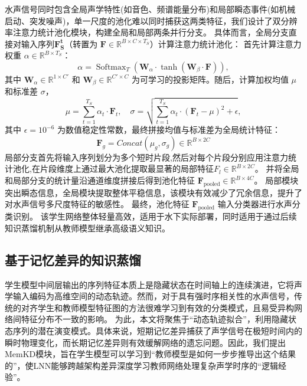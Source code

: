 \documentclass[a4paper, 12pt]{article}
\begin{document}
水声信号同时包含全局声学特性(如音色、频谱能量分布)和局部瞬态事件(如机械启动、突发噪声)，单一尺度的池化难以同时捕获这两类特征，我们设计了双分辨率注意力统计池化模块，构建全局和局部两条并行分支。
具体而言，全局分支直接对输入序列$\mathbf{F_S^t}$（转置为 $\textbf{F}\in \mathbb{R}^{B \times C \times T_S}  $）计算注意力统计池化：
首先计算注意力权重 $  \alpha \in \mathbb{R}^{B \times T_S}  $：
\begin{equation}
\alpha = \operatorname{Softmax}_T \left( \mathbf{W}_{\alpha} \cdot \tanh(\mathbf{W}_{\beta} \cdot \mathbf{F}) \right),
\end{equation}
其中 $  \mathbf{W}_{\alpha} \in \mathbb{R}^{1 \times C'}  $ 和 $  \mathbf{W}_{\beta} \in \mathbb{R}^{C' \times C}  $ 为可学习的投影矩阵。随后，计算加权均值 $  \mu  $ 和标准差 $  \sigma  $，
\begin{equation}
\mu = \sum_{t=1}^{T_S} \alpha_t \cdot \mathbf{F}_t, \quad
\sigma = \sqrt{ \sum_{t=1}^{T_S} \alpha_t \cdot (\mathbf{F}_ t - \mu)^2 + \epsilon },
\end{equation}
其中 $  \epsilon=10^{-6}  $ 为数值稳定性常数，最终拼接均值与标准差为全局统计特征：
\begin{equation}
\mathbf{F}_{g}=Concat(\mu_g,\sigma_g) \in \mathbb{R}^{B \times 2C}
\end{equation}
局部分支首先将输入序列划分为多个短时片段,然后对每个片段分别应用注意力统计池化,在片段维度上通过最大池化提取最显著的局部特征$F_l \in \mathbb{R}^{B \times 2C}$。
并将全局和局部分支的统计量沿通道维度拼接后得到池化特征 $  \mathbf{F}_{\text{pooled}} \in \mathbb{R}^{B \times 4C}  $。
局部模块突出瞬态信息，全局模块提取整体平稳信息，该模块有效减少了冗余信息，提升了对水声信号多尺度特征的敏感性。
最终，池化特征 $\mathbf{F}_{\text{pooled}}$ 输入分类器进行水声分类识别。
该学生网络整体轻量高效，适用于水下实际部署，同时适用于通过后续知识蒸馏机制从教师模型继承高级语义知识。
\subsection{基于记忆差异的知识蒸馏}
\label{subsec:memkd}

学生模型中间层输出的序列特征本质上是隐藏状态在时间轴上的连续演进，它将声学输入编码为高维空间的动态轨迹。然而，对于具有强时序相关性的水声信号，传统的对齐学生和教师模型特征图的方法很难学习到有效的分类模式，且易受异构网络间特征分布不一致的影响。
为此，本文将聚焦于“动态轨迹拟合”，利用隐藏状态序列的潜在演变模式。具体来说，短期记忆差异捕获了声学信号在极短时间内的瞬时物理变化，而长期记忆差异则有效缓解网络的遗忘问题。因此，我们提出MemKD模块，旨在学生模型可以学习到“教师模型是如何一步步推导出这个结果的”，使LNN能够跨越架构差异深度学习教师网络处理复杂声学时序的“逻辑经验”。
\end{document}
